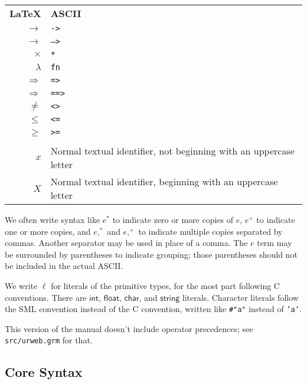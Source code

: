 \documentclass{article}
\newcommand{\cd}[1]{\texttt{#1}}
\newcommand{\mt}[1]{\mathsf{#1}}
\begin{document}
\begin{center}
  \begin{tabular}{rl}
    \textbf{\LaTeX} & \textbf{ASCII} \\
    $\to$ & \cd{->} \\
    $\longrightarrow$ & \cd{-->} \\
    $\times$ & \cd{*} \\
    $\lambda$ & \cd{fn} \\
    $\Rightarrow$ & \cd{=>} \\
    $\Longrightarrow$ & \cd{==>} \\
    $\neq$ & \cd{<>} \\
    $\leq$ & \cd{<=} \\
    $\geq$ & \cd{>=} \\
    \\
    $x$ & Normal textual identifier, not beginning with an uppercase letter \\
    $X$ & Normal textual identifier, beginning with an uppercase letter \\
  \end{tabular}
\end{center}

We often write syntax like $e^*$ to indicate zero or more copies of $e$, $e^+$ to indicate one or more copies, and $e,^*$ and $e,^+$ to indicate multiple copies separated by commas.  Another separator may be used in place of a comma.  The $e$ term may be surrounded by parentheses to indicate grouping; those parentheses should not be included in the actual ASCII.

We write $\ell$ for literals of the primitive types, for the most part following C conventions.  There are $\mt{int}$, $\mt{float}$, $\mt{char}$, and $\mt{string}$ literals.  Character literals follow the SML convention instead of the C convention, written like \texttt{\#"a"} instead of \texttt{'a'}.

This version of the manual doesn't include operator precedences; see \texttt{src/urweb.grm} for that.

\subsection{\label{core}Core Syntax}
\end{document}
